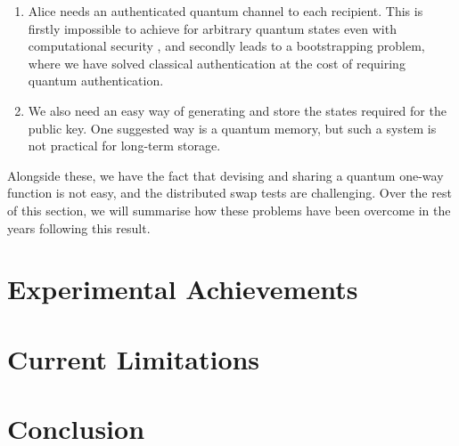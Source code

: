 \documentclass[%
 reprint,
 amsmath,amssymb,
 aps,
 pra,
]{revtex4-1}
\begin{document}
\begin{enumerate}
\item Alice needs an authenticated quantum channel to each recipient. This is firstly impossible to achieve for arbitrary quantum states even with computational security \cite{1181969}, and secondly leads to a bootstrapping problem, where we have solved classical authentication at the cost of requiring quantum authentication.
\item We also need an easy way of generating and store the states required for the public key. One suggested way is a quantum memory, but such a system is not practical for long-term storage.
\end{enumerate}

Alongside these, we have the fact that devising and sharing a quantum one-way function is not easy, and the distributed swap tests are challenging. Over the rest of this section, we will summarise how these problems have been overcome in the years following this result.

\section{Experimental Achievements}

\section{Current Limitations}

\section{Conclusion}

\end{document}
